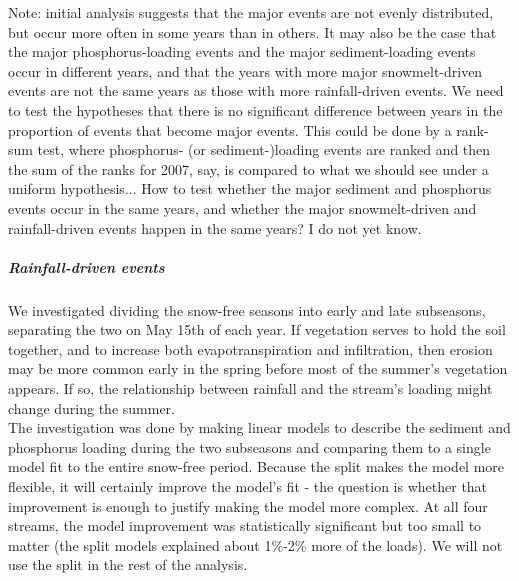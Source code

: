 \documentclass[10pt]{article}
\begin{document}
Note: initial analysis suggests that the major events are not evenly distributed, but occur more often in some years than in others. It may also be the case that the major phosphorus-loading events and the major sediment-loading events occur in different years, and that the years with more major snowmelt-driven events are not the same years as those with more rainfall-driven events. We need to test the hypotheses that there is no significant difference between years in the proportion of events that become major events. This could be done by a rank-sum test, where phosphorus- (or sediment-)loading events are ranked and then the sum of the ranks for 2007, say, is compared to what we should see under a uniform hypothesis... How to test whether the major sediment and phosphorus events occur in the same years, and whether the major snowmelt-driven and rainfall-driven events happen in the same years? I do not yet know.


\subparagraph{Rainfall-driven events}
We investigated dividing the snow-free seasons into early and late subseasons, separating the two on May 15th of each year. If vegetation serves to hold the soil together, and to increase both evapotranspiration and infiltration, then erosion may be more common early in the spring before most of the summer's vegetation appears. If so, the relationship between rainfall and the stream's loading might change during the summer.\\

The investigation was done by making linear models to describe the sediment and phosphorus loading during the two subseasons and comparing them to a single model fit to the entire snow-free period. Because the split makes the model more flexible, it will certainly improve the model's fit - the question is whether that improvement is enough to justify making the model more complex. At all four streams, the model improvement was statistically significant but too small to matter (the split models explained about 1\%-2\% more of the loads). We will not use the split in the rest of the analysis.\\
\end{document}
